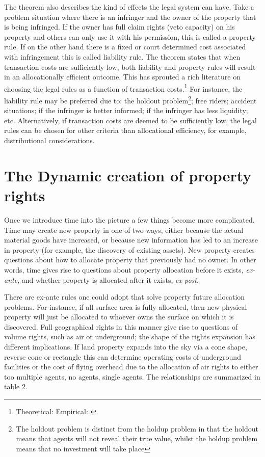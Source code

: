 \documentclass[12pt]{report}
\numberwithin{equation}{section}
\begin{document}
The theorem also describes the kind of effects the legal system can have. Take a problem situation where there is an infringer and the owner of the property that is being infringed. If the owner has full claim rights (veto capacity) on his property and others can only use it with his permission, this is called a property rule. If on the other hand there is a fixed or court determined cost associated with infringement this is called liability rule. The theorem states that when transaction costs are sufficiently low, both liability and property rules will result in an allocationally efficient outcome. This has sprouted a rich literature on choosing the legal rules as a function of transaction costs.\footnote{Theoretical: \cite{calabresi1972property} Empirical: \cite{kaplow1995property}} For instance, the liability rule may be preferred due to: the holdout problem\footnote{The holdout problem is distinct from the holdup problem in that the holdout means that agents will not reveal their true value, whilst the holdup problem means that no investment will take place}; free riders; accident situations; if the infringer is better informed; if the infringer has less liquidity; etc. Alternatively, if transaction costs are deemed to be sufficiently low, the legal rules can be chosen for other criteria than allocational efficiency, for example, distributional considerations.



\newpage

\section{The Dynamic creation of property rights}\label{dynamic}

Once we introduce time into the picture a few things become more complicated. Time may create new property in one of two ways, either because the actual material goods have increased, or because new information has led to an increase in property (for example, the discovery of existing assets). New property creates questions about how to allocate property that previously had no owner. In other words, time gives rise to questions about property allocation before it exists, \textit{ex-ante}, and whether property is allocated after it exists, \textit{ex-post}.

There are ex-ante rules one could adopt that solve property future allocation problems. For instance, if all surface area is fully allocated, then new physical property will just be allocated to whoever owns the surface on which it is discovered. Full geographical rights in this manner give rise to questions of volume rights, such as air or underground; the shape of the rights expansion has different implications. If land property expands into the sky via a cone shape, reverse cone or rectangle this can determine operating costs of underground facilities or the cost of flying overhead due to the allocation of air rights to either too multiple agents, no agents, single agents. The relationships are summarized in table 2.
\end{document}
